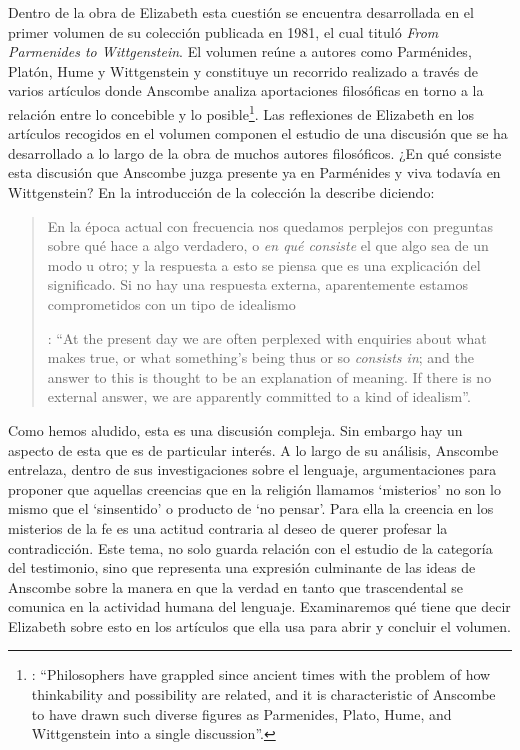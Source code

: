 Dentro de la obra de Elizabeth esta cuestión se encuentra desarrollada en el primer volumen de su colección publicada en 1981, el cual tituló \emph{From Parmenides to Wittgenstein}. El volumen reúne a autores como Parménides, Platón, Hume y Wittgenstein y constituye un recorrido realizado a través de varios artículos donde Anscombe analiza aportaciones filosóficas en torno a la relación entre lo concebible y lo posible\footnote{\cite[Cf.][193]{teichmann2008ans}: \enquote{Philosophers have grappled since ancient times with the problem of how thinkability and possibility are related, and it is characteristic of Anscombe to have drawn such diverse figures as Parmenides, Plato, Hume, and Wittgenstein into a single discussion}.}. Las reflexiones de Elizabeth en los artículos recogidos en el volumen componen el estudio de una discusión que se ha desarrollado a lo largo de la obra de muchos autores filosóficos. ¿En qué consiste esta discusión que Anscombe juzga presente ya en Parménides y viva todavía en Wittgenstein? En la introducción de la colección la describe diciendo: 
\blockquote[{\Cite[xi]{anscombe1981parmenides}}: \enquote{At the present day we are often perplexed with enquiries about what makes true, or what something's being thus or so \emph{consists in}; and the answer to this is thought to be an explanation of meaning. If there is no external answer, we are apparently committed to a kind of idealism}.]{En la época actual con frecuencia nos quedamos perplejos con preguntas sobre qué hace a algo verdadero, o \emph{en qué consiste} el que algo sea de un modo u otro; y la respuesta a esto se piensa que es una explicación del significado. Si no hay una respuesta externa, aparentemente estamos comprometidos con un tipo de idealismo}.\label{subsec:intextq}

Como hemos aludido, esta es una discusión compleja. Sin embargo hay un aspecto de esta que es de particular interés. A lo largo de su análisis, Anscombe entrelaza, dentro de sus investigaciones sobre el lenguaje, argumentaciones para proponer que aquellas creencias que en la religión llamamos `misterios' no son lo mismo que el `sinsentido' o producto de `no pensar'. Para ella la creencia en los misterios de la fe es una actitud contraria al deseo de querer profesar la contradicción. Este tema, no solo guarda relación con el estudio de la categoría del testimonio, sino que representa una expresión culminante de las ideas de Anscombe sobre la manera en que la verdad en tanto que trascendental se comunica en la actividad humana del lenguaje. Examinaremos qué tiene que decir Elizabeth sobre esto en los artículos que ella usa para abrir y concluir el volumen.

